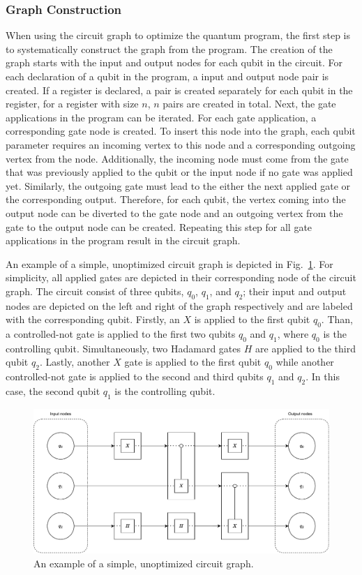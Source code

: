 \subsubsection{Graph Construction}
When using the circuit graph to optimize the quantum program, the first step is to systematically construct the graph from the program. The creation of the graph starts with the input and output nodes for each qubit in the circuit. For each declaration of a qubit in the program, a input and output node pair is created. If a register is declared, a pair is created separately for each qubit in the register, \ie for a register with size $n$, $n$ pairs are created in total. Next, the gate applications in the program can be iterated. For each gate application, a corresponding gate node is created. To insert this node into the graph, each qubit parameter requires an incoming vertex to this node and a corresponding outgoing vertex from the node. Additionally, the incoming node must come from the gate that was previously applied to the qubit or the input node if no gate was applied yet. Similarly, the outgoing gate must lead to the either the next applied gate or the corresponding output. Therefore, for each qubit, the vertex coming into the output node can be diverted to the gate node and an outgoing vertex from the gate to the output node can be created. Repeating this step for all gate applications in the program result in the circuit graph.

An example of a simple, unoptimized circuit graph is depicted in Fig.~\ref{fig:circuit_graph_unoptimized}. For simplicity, all applied gates are depicted in their corresponding node of the circuit graph. The circuit consist of three qubits, $q_0$, $q_1$, and $q_2$; their input and output nodes are depicted on the left and right of the graph respectively and are labeled with the corresponding qubit. Firstly, an $X$ is applied to the first qubit $q_0$. Than, a controlled-not gate is applied to the first two qubits $q_0$ and $q_1$, where $q_0$ is the controlling qubit. Simultaneously, two Hadamard gates $H$ are applied to the third qubit $q_2$. Lastly, another $X$ gate is applied to the first qubit $q_0$ while another controlled-not gate is applied to the second and third qubits $q_1$ and $q_2$. In this case, the second qubit $q_1$ is the controlling qubit.

\begin{figure}[htp]
    \centering     
    \includegraphics[width=.9\textwidth]{../figures/circuit_graph_unoptimized.pdf}
    \caption{An example of a simple, unoptimized circuit graph.}
    \label{fig:circuit_graph_unoptimized}
\end{figure}

